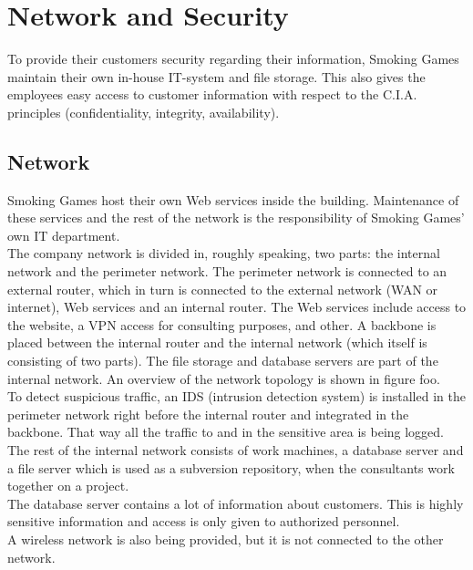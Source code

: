 \newpage
\section{Network and Security}
To provide their customers security regarding their information, Smoking Games maintain their own in-house IT-system and file storage. This also gives the employees easy access to customer information with respect to the C.I.A. principles (confidentiality, integrity, availability).
\subsection{Network}
Smoking Games host their own Web services inside the building. Maintenance of these services and the rest of the network is the responsibility of Smoking Games' own IT department.\\
The company network is divided in, roughly speaking, two parts: the internal network and the perimeter network. The perimeter network is connected to an external router, which in turn is connected to the external network (WAN or internet), Web services and an internal router. The Web services include access to the website, a VPN access for consulting purposes, and other. A backbone is placed between the internal router and the internal network (which itself is consisting of two parts). The file storage and database servers are part of the internal network. An overview of the network topology is shown in figure foo.\\
To detect suspicious traffic, an IDS (intrusion detection system) is installed in the perimeter network right before the internal router and integrated in the backbone. That way all the traffic to and in the sensitive area is being logged.\\
The rest of the internal network consists of work machines, a database server and a file server which is used as a subversion repository, when the consultants work together on a project.\\
The database server contains a lot of information about customers. This is highly sensitive information and access is only given to authorized personnel.\\
A wireless network is also being provided, but it is not connected to the other network.
